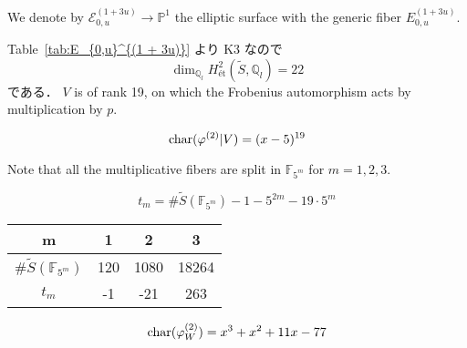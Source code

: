 \documentclass[main]{subfiles}
\begin{document}
We denote by $\mathcal{E}_{0,u}^{(1 + 3u)} \to \mathbb{P}^1$ the elliptic surface with the generic fiber $E_{0,u}^{(1 + 3u)}$.

Table~\ref{tab:E_{0,u}^{(1 + 3u)}} より K3 なので
\begin{equation}
    \dim_{\mathbb{Q}_{l}} H_{\text{\'et}}^{2}(\tilde{S}, \mathbb{Q}_{l}) = 22
\end{equation}
である．
$V$ is of rank 19, on which the Frobenius automorphism acts by multiplication by $p$.

\begin{equation}
    \operatorname{char} (\varphi^{(2)} | V) = (x - 5)^{19}
\end{equation}

Note that all the multiplicative fibers are split in $\mathbb{F}_{5^{m}}$ for $m=1,2,3$.

\begin{equation}
    t_{m} = \# \tilde{S}(\mathbb{F}_{5^{m}}) - 1 - 5^{2m} - 19 \cdot 5^{m}
\end{equation}

\begin{table}[h]
    \centering
    \begin{tabular}{|c|c|c|c|}
        \hline
        m                                & 1   & 2    & 3     \\
        \hline
        $\# \tilde{S}(\mathbb{F}_{5^m})$ & 120 & 1080 & 18264 \\
        \hline
        $t_m$                            & -1  & -21  & 263   \\
        \hline
    \end{tabular}
    \label{tab:sample}
\end{table}

\begin{equation}
    \operatorname{char}(\varphi_{W}^{(2)}) = x^{3} + x^{2} + 11 x - 77
\end{equation}
\end{document}

